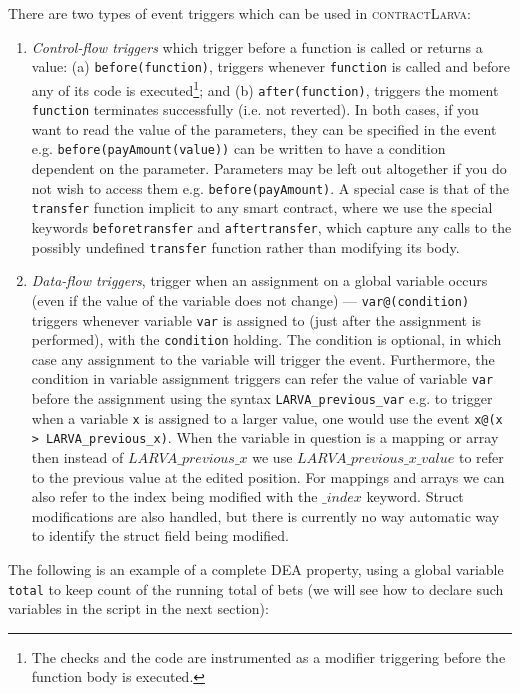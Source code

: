 \documentclass{article}
\newcommand{\contractlarva}{\textsc{contractLarva}\xspace}
\begin{document}
  \noindent There are two types of event triggers which can be used in \contractlarva:
  \begin{enumerate}[label=(\roman*)]
    \item \emph{Control-flow triggers} which trigger before a function is called or returns a value: (a) \texttt{before(function)}, triggers whenever \texttt{function} is called and before any of its code is executed\footnote{The checks and the code are instrumented as a modifier triggering before the function body is executed.}; and (b) \texttt{after(function)}, triggers the moment \texttt{function} terminates successfully (i.e. not reverted). In both cases, if you want to read the value of the parameters, they can be specified in the event e.g. \texttt{before(payAmount(value))} can be written to have a condition dependent on the parameter. Parameters may be left out altogether if you do not wish to access them e.g.  \texttt{before(payAmount)}. A special case is that of the \texttt{transfer} function implicit to any smart contract, where we use the special keywords \texttt{beforetransfer} and \texttt{aftertransfer}, which capture any calls to the possibly undefined \texttt{transfer} function rather than modifying its body.
    \item \emph{Data-flow triggers}, trigger when an assignment on a global variable occurs (even if the value of the variable does not change) --- \texttt{var@(condition)}  triggers whenever variable \texttt{var} is assigned to (just after the assignment is performed), with the \texttt{condition} holding. The condition is optional, in which case any assignment to the variable will trigger the event. Furthermore, the condition in variable assignment triggers can refer the value of variable \texttt{var} before the assignment using the syntax \texttt{LARVA\_previous\_var} e.g. to trigger when a variable \texttt{x} is assigned to a larger value, one would use the event \texttt{x@(x > LARVA\_previous\_x)}. When the variable in question is a mapping or array then instead of $LARVA\_previous\_x$ we use $LARVA\_previous\_x\_value$ to refer to the previous value at the edited position. For mappings and arrays we can also refer to the index being modified with the $\_index$ keyword. Struct modifications are also handled, but there is currently no way automatic way to identify the struct field being modified.
  \end{enumerate}
      
  \noindent The following is an example of a complete DEA property, using a global variable \texttt{total} to keep count of the running total of bets (we will see how to declare such variables in the script in the next section):
  
\end{document}
